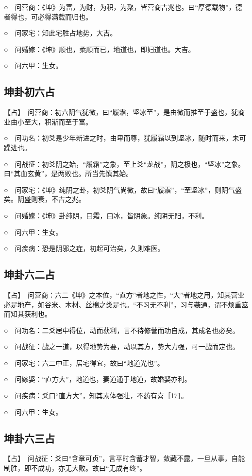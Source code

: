 \documentclass[12pt,oneside]{book}
\begin{document}
○　问营商：《坤》为富，为财，为积，为聚，皆营商吉兆也。曰“厚德载物”，德者得也，可必得满载而归也。

○　问家宅：知此宅胜占地势，大吉。

○　问婚嫁：《坤》顺也，柔顺而已，地道也，即妇道也。大吉。

○　问六甲：生女。

\subsection{坤卦初六占}
【占】　问营商：初六阴气犹微，曰“履霜，坚冰至”，是由微而推至于盛也，犹商业由小至大，积渐而至于富。

○　问功名：初爻是少年新进之时，由卑而尊，犹履霜以到坚冰，随时而来，未可躁进也。

○　问战征：初爻阴之始，“履霜”之象，至上爻“龙战”，阴之极也，“坚冰”之象。曰“其血玄黄”，是两败也。所当先慎其始。

○　问家宅：《坤》纯阴之卦，初爻阴气尚微，故曰“履霜”，“至坚冰”，则阴气盛矣。阴盛则衰，不吉之兆。

○　问婚嫁：《坤》卦纯阴，曰霜，曰冰，皆阴象。纯阴无阳，不利。

○　问六甲：生女。

○　问疾病：恐是阴邪之症，初起可治矣，久则难医。

\subsection{坤卦六二占}
【占】　问营商：六二《坤》之本位，“直方”者地之性，“大”者地之用，知其营业必是地产，如谷米、木材、丝棉之类是也。“不习无不利”，习与袭通，谓不烦重筮而知其获利也。

○　问功名：二爻居中得位，动而获利，言不待修营而功自成，其成名也必矣。

○　问战征：战之一道，以得地势为要，动以其方，势大力强，可一战而定也。

○　问家宅：六二中正，居宅得宜，故曰“地道光也”。

○　问嫁娶：“直方大”，地道也，妻道通于地道，故婚娶亦利。

○　问疾病：爻曰“直方大”，知其素体强壮，不药有喜［17］。

○　问六甲：生女。


\subsection{坤卦六三占}
【占】　问战征：爻曰“含章可贞”，言平时含蓄才智，敛藏不露，一旦从事，自能制胜，即不成功，亦无大败。故曰“无成有终”。
\end{document}
